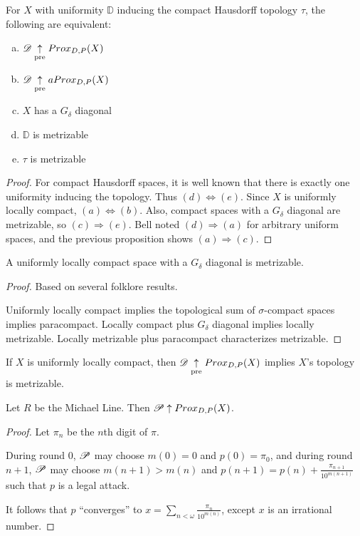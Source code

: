 \begin{corollary}
  For $X$ with uniformity $\mathbb{D}$ inducing the compact Hausdorff topology 
  $\tau$, the following are equivalent:
    \begin{enumerate}[(a)]
      \item $\mathscr{D} \underset{\text{pre}}{\uparrow} Prox_{D,P}(X)$
      \item $\mathscr{D} \underset{\text{pre}}{\uparrow} aProx_{D,P}(X)$
      \item $X$ has a $G_\delta$ diagonal
      \item $\mathbb{D}$ is metrizable
      \item $\tau$ is metrizable
    \end{enumerate}
\end{corollary}

\begin{proof}
  For compact Hausdorff spaces, it is well known that there is exactly one
  uniformity inducing the topology. Thus $(d)\Leftrightarrow(e)$. Since $X$
  is uniformly locally compact, $(a)\Leftrightarrow(b)$. Also, compact spaces
  with a $G_\delta$ diagonal are metrizable, so $(c)\Rightarrow(e)$. 
  Bell noted $(d)\Rightarrow(a)$ 
  for arbitrary uniform spaces, and the previous proposition shows
  $(a)\Rightarrow(c)$.
\end{proof}

\begin{theorem}
  A uniformly locally compact space with a $G_\delta$ diagonal is metrizable.
\end{theorem}

\begin{proof}
  Based on several folklore results.

  Uniformly locally compact implies the topological sum of $\sigma$-compact
  spaces implies paracompact. Locally compact plus $G_\delta$ diagonal implies
  locally metrizable. Locally metrizable plus paracompact characterizes
  metrizable.
\end{proof}

\begin{corollary}
  If $X$ is uniformly locally compact, then $\mathscr{D} \underset{\text{pre}}{\uparrow} Prox_{D,P}(X)$ 
  implies $X$'s topology is metrizable.
\end{corollary}





\newpage

\begin{example}
  Let $R$ be the Michael Line. Then $\mathscr{P}\uparrow Prox_{D,P}(X)$.
\end{example}

\begin{proof}
  Let $\pi_n$ be the $n$th digit of $\pi$. 
  
  During round $0$, $\mathscr{P}$ may choose $m(0)=0$ and $p(0)=\pi_0$, 
  and during round $n+1$,
  $\mathscr{P}$ may choose $m(n+1)>m(n)$ and
  $p(n+1)=p(n)+\frac{\pi_{n+1}}{10^{m(n+1)}}$ such that $p$ is a legal attack.
  
  It follows that $p$ ``converges'' to 
  $x=\sum_{n<\omega}\frac{\pi_n}{10^{m(n)}}$, except $x$ is an irrational
  number.
\end{proof}

